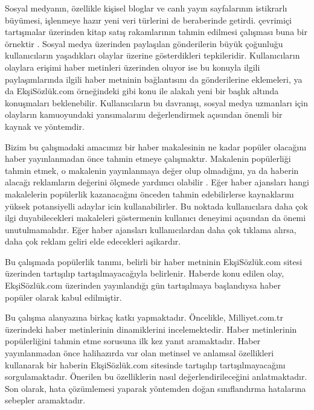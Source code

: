 \documentclass[conference]{IEEEtran}
\begin{document}
Sosyal medyan{\i}n, özellikle ki\c{s}isel bloglar ve canl{\i} yay{\i}n sayfalar{\i}n{\i}n istikrarl{\i} büyümesi, i\c{s}lenmeye haz{\i}r yeni veri türlerini de beraberinde getirdi. \c{c}evrimi\c{c}i tart{\i}\c{s}malar üzerinden kitap sat{\i}\c{s} rakamlar{\i}n{\i}n tahmin edilmesi \c{c}al{\i}\c{s}mas{\i} buna bir örnektir \cite{gruhl_predictive_2005}. Sosyal medya üzerinden payla\c{s}{\i}lan gönderilerin büyük \c{c}o\u{g}unlu\u{g}u kullan{\i}c{\i}lar{\i}n ya\c{s}ad{\i}klar{\i} olaylar üzerine gösterdikleri tepkileridir. Kullan{\i}c{\i}lar{\i}n olaylara eri\c{s}imi haber metinleri üzerinden oluyor ise bu konuyla ilgili payla\c{s}{\i}mlar{\i}nda ilgili haber metninin ba\u{g}lant{\i}s{\i}n{\i} da gönderilerine eklemeleri, ya da Ek\c{s}iSözlük.com örne\u{g}indeki gibi konu ile alakal{\i} yeni bir ba\c{s}l{\i}k alt{\i}nda konu\c{s}malar{\i} beklenebilir. Kullan{\i}c{\i}lar{\i}n bu davran{\i}\c{s}{\i}, sosyal medya uzmanlar{\i} i\c{c}in olaylar{\i}n kamuoyundaki yans{\i}malar{\i}n{\i} de\u{g}erlendirmek a\c{c}{\i}s{\i}ndan önemli bir kaynak ve yöntemdir.

Bizim bu \c{c}al{\i}\c{s}madaki amac{\i}m{\i}z bir haber makalesinin ne kadar popüler olaca\u{g}{\i}n{\i} haber yay{\i}nlanmadan önce tahmin etmeye \c{c}al{\i}\c{s}makt{\i}r. Makalenin popülerli\u{g}i tahmin etmek, o makalenin yay{\i}nlanmaya de\u{g}er olup olmad{\i}\u{g}{\i}n{\i}, ya da haberin alaca\u{g}{\i} reklamlar{\i}n de\u{g}erini öl\c{c}mede yard{\i}mc{\i} olabilir \cite{phukan_feasibility_2016}. E\u{g}er haber ajanslar{\i} hangi makalelerin popülerlik kazanaca\u{g}{\i}n{\i} önceden tahmin edebilirlerse kaynaklar{\i}n{\i} yüksek potansiyelli adaylar icin kullanabilirler. Bu noktada kullan{\i}c{\i}lara daha \c{c}ok ilgi duyabilecekleri makaleleri göstermenin kullan{\i}c{\i} deneyimi a\c{c}{\i}s{\i}ndan da önemi unutulmamal{\i}d{\i}r. E\u{g}er haber ajanslar{\i} kullan{\i}c{\i}lardan daha \c{c}ok t{\i}klama al{\i}rsa, daha \c{c}ok reklam geliri elde edecekleri a\c{s}ikard{\i}r. \cite{bandari_pulse_2012}

Bu \c{c}al{\i}\c{s}mada popülerlik tan{\i}m{\i}, belirli bir haber metninin Ek\c{s}iSözlük.com sitesi üzerinden tart{\i}\c{s}{\i}l{\i}p tart{\i}\c{s}{\i}lmayaca\u{g}{\i}yla belirlenir. Haberde konu edilen olay, Ek\c{s}iSözlük.com üzerinden yay{\i}nland{\i}\u{g}{\i} gün tart{\i}\c{s}{\i}lmaya ba\c{s}land{\i}ysa haber popüler olarak kabul edilmi\c{s}tir.

Bu \c{c}al{\i}\c{s}ma alanyaz{\i}na birka\c{c} katk{\i} yapmaktad{\i}r. Öncelikle, Milliyet.com.tr üzerindeki haber metinlerinin dinamiklerini incelemektedir. Haber metinlerinin popülerli\u{g}ini tahmin etme sorusuna ilk kez yan{\i}t aramaktad{\i}r. Haber yay{\i}nlanmadan önce halihaz{\i}rda var olan metinsel ve anlamsal özellikleri kullanarak bir haberin Ek\c{s}iSözlük.com sitesinde tart{\i}\c{s}{\i}l{\i}p tart{\i}\c{s}{\i}lmayaca\u{g}{\i}n{\i} sorgulamaktad{\i}r. Önerilen bu özelliklerin nas{\i}l de\u{g}erlendirilece\u{g}ini anlatmaktad{\i}r. Son olarak, hata \c{c}özümlemesi yaparak yöntemden do\u{g}an s{\i}n{\i}fland{\i}rma hatalar{\i}na sebepler aramaktad{\i}r.
\end{document}
